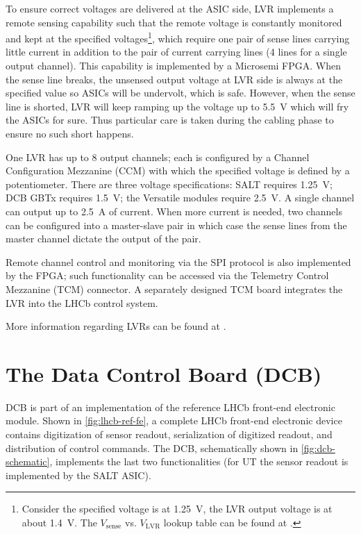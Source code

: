 To ensure correct voltages are delivered at the ASIC side,
LVR implements a remote sensing capability such that the remote voltage is
constantly monitored and kept at the specified voltages\footnote{
    Consider the specified voltage is at 1.25~V, the LVR output voltage is
    at about 1.4~V.
    The $V_\text{sense}$ vs. $V_\text{LVR}$ lookup table can be found at
    \cite{LVR_output_voltage_lookup}.
}, which require one
pair of sense lines carrying little current in addition to the pair of current
carrying lines (4 lines for a single output channel).
This capability is implemented by a Microsemi FPGA.
When the sense line breaks, the unsensed output voltage at LVR side is always
at the specified value so ASICs will be undervolt, which is safe.
However, when the sense line is shorted, LVR will keep ramping up the voltage
up to 5.5~V which will fry the ASICs for sure.
Thus particular care is taken during the cabling phase to ensure no such short
happens.

One LVR has up to 8 output channels; each is configured by a Channel
Configuration Mezzanine (CCM) with which the specified voltage is defined by a
potentiometer.
There are three voltage specifications: SALT requires 1.25~V; DCB GBTx requires
1.5~V; the Versatile modules require 2.5~V.
A single channel can output up to 2.5~A of current.
When more current is needed, two channels can be configured into a master-slave
pair in which case the sense lines from the master channel dictate the output
of the pair.

Remote channel control and monitoring via the SPI protocol is also implemented
by the FPGA;
such functionality can be accessed via the Telemetry Control Mezzanine (TCM)
connector.
A separately designed TCM board integrates the LVR into the LHCb control system.

More information regarding LVRs can be found at \cite{LVR_manual}.


\section{The Data Control Board (DCB)}
\label{ref:ut:dcb}

DCB is part of an implementation of the reference LHCb front-end  electronic
module.
Shown in \cref{fig:lhcb-ref-fe},
a complete LHCb front-end electronic device contains digitization of sensor
readout, serialization of digitized readout, and distribution of control
commands.
The DCB,
schematically shown in \cref{fig:dcb-schematic},
implements the last two functionalities (for UT the sensor readout is implemented
by the SALT ASIC).

